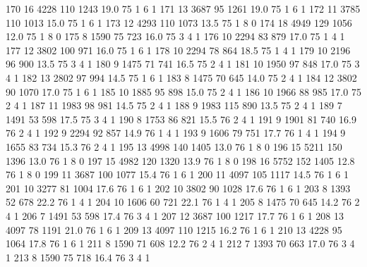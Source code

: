 \documentclass{article}
\begin{document}
\begin{Schunk}
\begin{Soutput}
170      16  4228 110 1243 19.0  75      1       6        1
171      13  3687  95 1261 19.0  75      1       6        1
172      11  3785 110 1013 15.0  75      1       6        1
173      12  4293 110 1073 13.5  75      1       8        0
174      18  4949 129 1056 12.0  75      1       8        0
175       8  1590  75  723 16.0  75      3       4        1
176      10  2294  83  879 17.0  75      1       4        1
177      12  3802 100  971 16.0  75      1       6        1
178      10  2294  78  864 18.5  75      1       4        1
179      10  2196  96  900 13.5  75      3       4        1
180       9  1475  71  741 16.5  75      2       4        1
181      10  1950  97  848 17.0  75      3       4        1
182      13  2802  97  994 14.5  75      1       6        1
183       8  1475  70  645 14.0  75      2       4        1
184      12  3802  90 1070 17.0  75      1       6        1
185      10  1885  95  898 15.0  75      2       4        1
186      10  1966  88  985 17.0  75      2       4        1
187      11  1983  98  981 14.5  75      2       4        1
188       9  1983 115  890 13.5  75      2       4        1
189       7  1491  53  598 17.5  75      3       4        1
190       8  1753  86  821 15.5  76      2       4        1
191       9  1901  81  740 16.9  76      2       4        1
192       9  2294  92  857 14.9  76      1       4        1
193       9  1606  79  751 17.7  76      1       4        1
194       9  1655  83  734 15.3  76      2       4        1
195      13  4998 140 1405 13.0  76      1       8        0
196      15  5211 150 1396 13.0  76      1       8        0
197      15  4982 120 1320 13.9  76      1       8        0
198      16  5752 152 1405 12.8  76      1       8        0
199      11  3687 100 1077 15.4  76      1       6        1
200      11  4097 105 1117 14.5  76      1       6        1
201      10  3277  81 1004 17.6  76      1       6        1
202      10  3802  90 1028 17.6  76      1       6        1
203       8  1393  52  678 22.2  76      1       4        1
204      10  1606  60  721 22.1  76      1       4        1
205       8  1475  70  645 14.2  76      2       4        1
206       7  1491  53  598 17.4  76      3       4        1
207      12  3687 100 1217 17.7  76      1       6        1
208      13  4097  78 1191 21.0  76      1       6        1
209      13  4097 110 1215 16.2  76      1       6        1
210      13  4228  95 1064 17.8  76      1       6        1
211       8  1590  71  608 12.2  76      2       4        1
212       7  1393  70  663 17.0  76      3       4        1
213       8  1590  75  718 16.4  76      3       4        1

\end{Soutput}
\end{Schunk}
\end{document}
